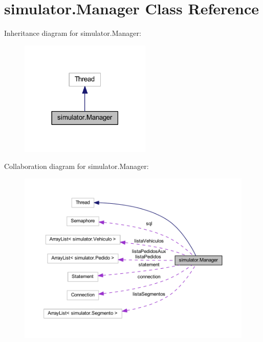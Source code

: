 \hypertarget{classsimulator_1_1_manager}{}\section{simulator.\+Manager Class Reference}
\label{classsimulator_1_1_manager}


Inheritance diagram for simulator.\+Manager\+:\nopagebreak
\begin{figure}[H]
\begin{center}
\leavevmode
\includegraphics[width=177pt]{classsimulator_1_1_manager__inherit__graph}
\end{center}
\end{figure}


Collaboration diagram for simulator.\+Manager\+:\nopagebreak
\begin{figure}[H]
\begin{center}
\leavevmode
\includegraphics[width=350pt]{classsimulator_1_1_manager__coll__graph}
\end{center}
\end{figure}
